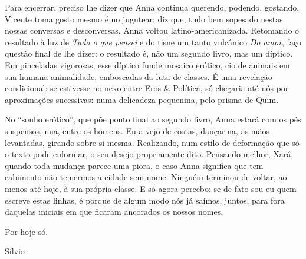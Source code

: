 Para encerrar, preciso lhe dizer que Anna continua querendo, podendo,
gostando. Vicente toma gosto mesmo é no jugutear: diz que, tudo bem
sopesado nestas nossas conversas e desconversas, Anna voltou
latino-americanizada. Retomando o resultado à luz de \emph{Tudo o que
pensei} e do tisne um tanto vulcânico \emph{Do amor}, faço questão final
de lhe dizer: o resultado é, não um segundo livro, mas um díptico. Em
pinceladas vigorosas, esse díptico funde mosaico erótico, cio de animais
em sua humana animalidade, emboscadas da luta de classes. É uma
revelação condicional: se estivesse no nexo entre Eros \& Política, só
chegaria até nós por aproximações sucessivas: numa delicadeza pequenina,
pelo prisma de Quim.

No ``sonho erótico'', que põe ponto final ao segundo livro, Anna estará
com os pés suspensos, nua, entre os homens. Eu a vejo de costas,
dançarina, as mãos levantadas, girando sobre si mesma. Realizando, num
estilo de deformação que só o texto pode enformar, o seu desejo
propriamente dito. Pensando melhor, Xará, quando toda mudança parece uma
piora, o caso Anna significa que tem cabimento não temermos a cidade sem
nome. Ninguém terminou de voltar, ao menos até hoje, à sua própria
classe. E só agora percebo: se de fato sou eu quem escreve estas linhas,
é porque de algum modo nós já saímos, juntos, para fora daquelas
iniciais em que ficaram ancorados os nossos nomes.

Por hoje só.
\medskip

\hfill Sílvio

